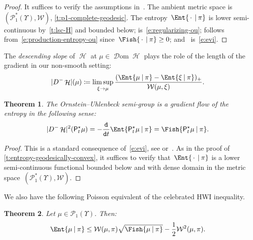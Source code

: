 \documentclass[JEP,XML,SOM,Unicode,published]{cedram}
\newtheorem{theorem}{Theorem}[section]
\theoremstyle{definition}
\theoremstyle{remark}
\DeclarePairedDelimiter{\paren}{\lparen}{\rparen}
\DeclarePairedDelimiter{\abs}{\lvert}{\rvert}
\newcommand{\given}[1][]{%
\nonscript\:#1\vert
\allowbreak
\nonscript\:
\mathopen{}}
\DeclareMathOperator{\ent}{\mathcal{H}}
\DeclareMathOperator{\dom}{\mathscr{D}om}
\newcommand{\emparg}{\,\cdot\,}
\begin{document}
\begin{proof}
It suffices to verify the assumptions in~\cite[Th.\,3.2]{DaneriSavare}.
The ambient metric space is $(\mathscr{P}_{1}^{*}(\varUpsilon),\mathcal{W})$, \cf \cref{t:p1-complete-geodesic}.
The entropy~$\Ent{\emparg \given\pi}$ is lower semi-continuous by~\cref{t:lsc-H} and bounded below;
\cite[Eq.\,(3.2a)]{DaneriSavare} is~\cref{e:regularizing-ou};
\cite[Eq.\,(3.2b)]{DaneriSavare} follows from~\cref{e:production-entropy-ou} since~$\Fish{\emparg\given\pi}\geq 0$; and~\cite[Eq.\,(3.2c)]{DaneriSavare} is~\cref{e:evi}.
\end{proof}

The \emph{descending slope} of $\ent$ at $\mu \in \dom \ent$ plays the role of the length of the gradient in our non-smooth setting:
\begin{equation*}
\abs{D^{-} \ent}(\mu) \coloneq \limsup_{\xi \to \mu} \frac{\paren{\Ent{ \mu \given \pi } - \Ent{ \xi \given \pi}}_{+}}{\mathcal{W}(\mu, \xi)}.
\end{equation*}

\begin{theorem}\label{t:ede}
The Ornstein--Uhlenbeck semi-group is a gradient flow of the entro\-py in the following sense:
\begin{equation*}
\abs{D^{-} \ent}^{2}(\mathsf{P}^{\star}_{t} \mu) = - \frac{\mathtt{d}}{\mathtt{d} t} \Ent{ \mathsf{P}^{\star}_{t} \mu \given \pi } = \Fish{ \mathsf{P}^{\star}_{t} \mu \given \pi }.
\end{equation*}
\end{theorem}

\begin{proof}
This is a standard consequence of~\cref{e:evi}, see \eg \cite[Prop.\,4.6]{AGUser} or~\cite[Eq.\,(3.17)]{MurSav20}.
As in the proof of \cref{t:entropy-geodesically-convex}, it suffices to verify that~$\Ent{\emparg\given\pi}$ is a lower semi-continuous functional bounded below and with dense domain in the metric space~$(\mathscr{P}_{1}^{*}(\varUpsilon),\mathcal{W})$.
\end{proof}

We also have the following Poisson equivalent of the celebrated HWI inequality.

\begin{theorem}\label{t:hwi}
Let $\mu \in \mathscr{P}_{1}(\varUpsilon)$.
Then:
\begin{equation*}
\Ent{ \mu \given \pi } \leq \mathcal{W}(\mu, \pi) \sqrt{\Fish{ \mu \given \pi }} - \frac{1}{2} \mathcal{W}^{2}(\mu, \pi).
\end{equation*}
\end{theorem}
\end{document}
